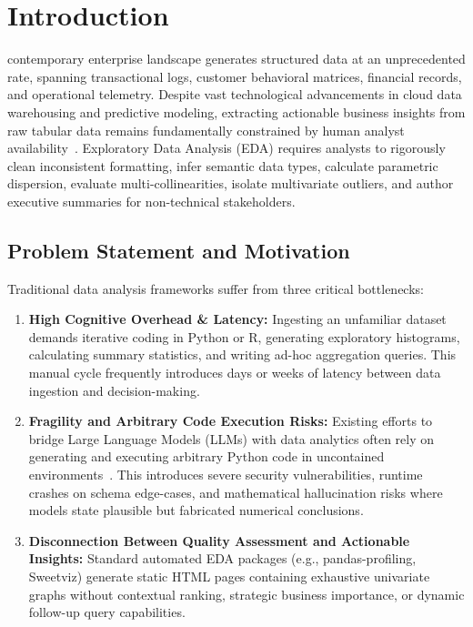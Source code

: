 \documentclass[10pt,journal,compsoc]{IEEEtran}
\begin{document}
\maketitle
\IEEEdisplaynontitleabstractindextext
\IEEEpeerreviewmaketitle

\section{Introduction}
 contemporary enterprise landscape generates structured data at an unprecedented rate, spanning transactional logs, customer behavioral matrices, financial records, and operational telemetry. Despite vast technological advancements in cloud data warehousing and predictive modeling, extracting actionable business insights from raw tabular data remains fundamentally constrained by human analyst availability~\cite{davenport2012data}. Exploratory Data Analysis (EDA) requires analysts to rigorously clean inconsistent formatting, infer semantic data types, calculate parametric dispersion, evaluate multi-collinearities, isolate multivariate outliers, and author executive summaries for non-technical stakeholders.

\subsection{Problem Statement and Motivation}
Traditional data analysis frameworks suffer from three critical bottlenecks:
\begin{enumerate}
    \item \textbf{High Cognitive Overhead \& Latency:} Ingesting an unfamiliar dataset demands iterative coding in Python or R, generating exploratory histograms, calculating summary statistics, and writing ad-hoc aggregation queries. This manual cycle frequently introduces days or weeks of latency between data ingestion and decision-making.
    \item \textbf{Fragility and Arbitrary Code Execution Risks:} Existing efforts to bridge Large Language Models (LLMs) with data analytics often rely on generating and executing arbitrary Python code in uncontained environments~\cite{gao2023pal}. This introduces severe security vulnerabilities, runtime crashes on schema edge-cases, and mathematical hallucination risks where models state plausible but fabricated numerical conclusions.
    \item \textbf{Disconnection Between Quality Assessment and Actionable Insights:} Standard automated EDA packages (e.g., pandas-profiling, Sweetviz) generate static HTML pages containing exhaustive univariate graphs without contextual ranking, strategic business importance, or dynamic follow-up query capabilities.
\end{enumerate}
\end{document}
